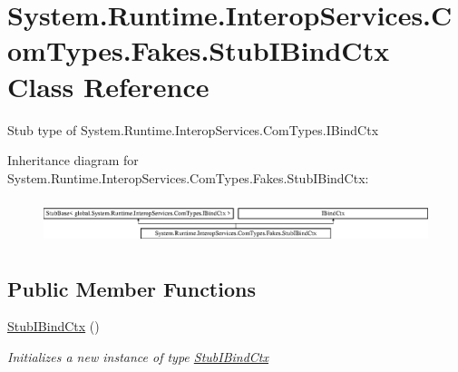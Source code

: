 \hypertarget{class_system_1_1_runtime_1_1_interop_services_1_1_com_types_1_1_fakes_1_1_stub_i_bind_ctx}{\section{System.\-Runtime.\-Interop\-Services.\-Com\-Types.\-Fakes.\-Stub\-I\-Bind\-Ctx Class Reference}
\label{class_system_1_1_runtime_1_1_interop_services_1_1_com_types_1_1_fakes_1_1_stub_i_bind_ctx}
}


Stub type of System.\-Runtime.\-Interop\-Services.\-Com\-Types.\-I\-Bind\-Ctx 


Inheritance diagram for System.\-Runtime.\-Interop\-Services.\-Com\-Types.\-Fakes.\-Stub\-I\-Bind\-Ctx\-:\begin{figure}[H]
\begin{center}
\leavevmode
\includegraphics[height=1.305361cm]{class_system_1_1_runtime_1_1_interop_services_1_1_com_types_1_1_fakes_1_1_stub_i_bind_ctx}
\end{center}
\end{figure}
\subsection*{Public Member Functions}
\begin{DoxyCompactItemize}
\item 
\hyperlink{class_system_1_1_runtime_1_1_interop_services_1_1_com_types_1_1_fakes_1_1_stub_i_bind_ctx_ac4bd8e8fa4fa1519d277b994d6ad9639}{Stub\-I\-Bind\-Ctx} ()
\begin{DoxyCompactList}\small\item\em Initializes a new instance of type \hyperlink{class_system_1_1_runtime_1_1_interop_services_1_1_com_types_1_1_fakes_1_1_stub_i_bind_ctx}{Stub\-I\-Bind\-Ctx}\end{DoxyCompactList}\end{DoxyCompactItemize}
